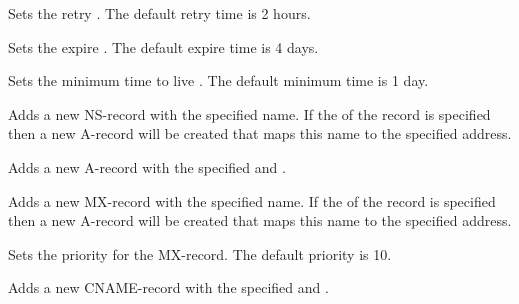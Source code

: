 Sets the retry . The default retry time is 2 hours.


Sets the expire . The default expire time is 4 days.


Sets the minimum time to live . The default minimum time is 1 day.


Adds a new NS-record with the specified name. If the 
of the record is specified then a new A-record will be created that maps this 
name to the specified address.


Adds a new A-record with the specified  and .


Adds a new MX-record with the specified name. If the 
of the record is specified then a new A-record will be created that maps this 
name to the specified address.


Sets the priority for the MX-record. The default priority is 10.


Adds a new CNAME-record with the specified  and .
